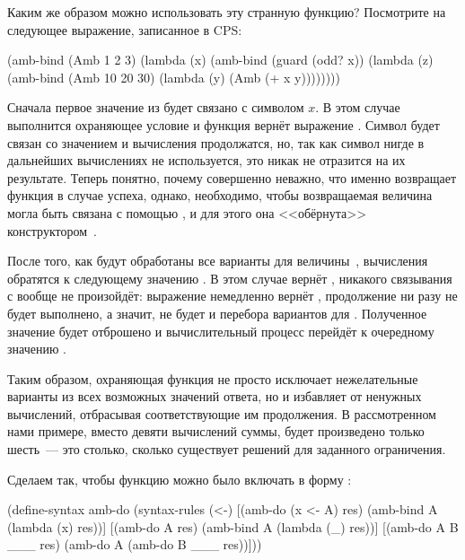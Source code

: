 Каким же образом можно использовать эту странную функцию? Посмотрите на следующее выражение, записанное в CPS:

\begin{SchemeCode}[emph={x,y,z}]
(amb-bind (Amb 1 2 3) 
          (lambda (x) 
            (amb-bind (guard (odd? x))
                      (lambda (z) 
                        (amb-bind (Amb 10 20 30)
                                  (lambda (y) (Amb (+ x y))))))))
\end{SchemeCode}

Сначала первое значение из  будет связано с символом $x$. В этом случае выполнится охраняющее условие и функция  вернёт выражение . Символ  будет связан со значением  и вычисления продолжатся, но, так как символ  нигде в дальнейших вычислениях не используется, это никак не отразится на их результате.  Теперь понятно, почему совершенно неважно, что именно возвращает функция  в случае успеха, однако, необходимо, чтобы возвращаемая величина могла быть связана с помощью , и для этого она <<обёрнута>> конструктором~.

После того, как будут обработаны все варианты для величины~, вычисления обратятся к следующему значению . В этом случае  вернёт , никакого связывания с  вообще не произойдёт: выражение  немедленно вернёт , продолжение  ни разу не будет выполнено, а значит, не будет и перебора вариантов для . Полученное значение  будет отброшено и вычислительный процесс перейдёт к очередному значению .

Таким образом, охраняющая функция  не просто исключает нежелательные варианты из всех возможных значений ответа, но и избавляет от ненужных вычислений, отбрасывая соответствующие им продолжения. В рассмотренном нами примере, вместо девяти вычислений суммы, будет произведено только шесть~--- это столько, сколько существует решений для заданного ограничения.

Сделаем так, чтобы функцию  можно было включать в форму :

\begin{Definition}[emph={x,A,res,B}]
(define-syntax amb-do
  (syntax-rules (<-) 
    [(amb-do (x <- A) res) (amb-bind A (lambda (x) res))]
    [(amb-do A res)        (amb-bind A (lambda (_) res))]
    [(amb-do A B ___ res)  (amb-do A (amb-do B ___ res))]))
\end{Definition}

